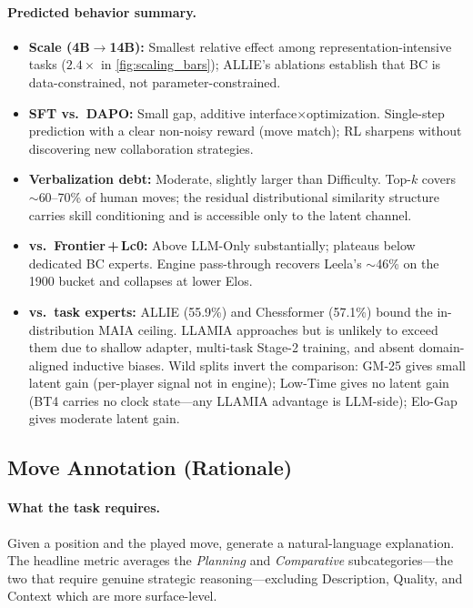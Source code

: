 \paragraph{Predicted behavior summary.}
\begin{itemize}[leftmargin=*, itemsep=2pt, topsep=2pt]
\item \textbf{Scale (4B${\to}$14B):} Smallest relative effect among
  representation-intensive tasks ($2.4{\times}$ in
  \cref{fig:scaling_bars}); ALLIE's ablations establish that BC is
  data-constrained, not parameter-constrained.
\item \textbf{SFT vs.\ DAPO:} Small gap, additive
  interface${\times}$optimization.
  Single-step prediction with a clear non-noisy reward (move match);
  RL sharpens without discovering new collaboration strategies.
\item \textbf{Verbalization debt:} Moderate, slightly larger than
  Difficulty.
  Top-$k$ covers ${\sim}$60--70\% of human moves; the residual
  distributional similarity structure carries skill conditioning and
  is accessible only to the latent channel.
\item \textbf{vs.\ Frontier\,+\,Lc0:} Above LLM-Only substantially;
  plateaus below dedicated BC experts.
  Engine pass-through recovers Leela's ${\sim}$46\% on the 1900 bucket
  and collapses at lower Elos.
\item \textbf{vs.\ task experts:} ALLIE (55.9\%) and Chessformer
  (57.1\%) bound the in-distribution MAIA ceiling.
  LLAMIA approaches but is unlikely to exceed them due to shallow
  adapter, multi-task Stage-2 training, and absent domain-aligned
  inductive biases.
  Wild splits invert the comparison: GM-25 gives small latent gain
  (per-player signal not in engine); Low-Time gives no latent gain
  (BT4 carries no clock state---any LLAMIA advantage is LLM-side);
  Elo-Gap gives moderate latent gain.
\end{itemize}

\subsection{Move Annotation (Rationale)}
\label{sec:app_landscape_annotation}

\paragraph{What the task requires.}
Given a position and the played move, generate a natural-language
explanation.
The headline metric averages the \emph{Planning} and \emph{Comparative}
subcategories---the two that require genuine strategic reasoning---excluding
Description, Quality, and Context which are more surface-level.

